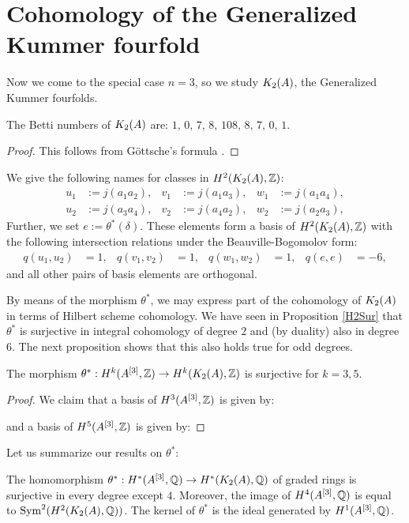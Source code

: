 \section{Cohomology of the Generalized Kummer fourfold}
Now we come to the special case $n=3$, so we study $\kum{A}{2}$, the Generalized Kummer fourfolds.
\begin{proposition}
The Betti numbers of $\kum{A}{2}$ are:
$
1,\,0,\,7,\,8,\,108,\,8,\,7,\,0,\,1.
$
\end{proposition}
\begin{proof}
This follows from G\"ottsche's formula \cite[page 49]{Gottsche}.
\end{proof}


\begin{notation} We give the following names for classes in $H^2(\kum{A}{2},\Z)$:
\begin{align*}
u_1 &:= j(a_1 a_2), & v_1 &:= j(a_1 a_3), & w_1 &:= j(a_1 a_4), \\ 
u_2 &:= j(a_3 a_4), & v_2 &:= j(a_4 a_2), & w_2 &:= j(a_2 a_3),
\end{align*}
Further, we set $e:=\theta^*(\delta)$.
These elements form a basis of $H^2(\kum{A}{2},\Z)$ with the following intersection relations under the Beauville-Bogomolov form:
\begin{align*}
q(u_1,u_2) &= 1, & q(v_1,v_2) &= 1, & q(w_1,w_2) &= 1,  &
q(e,e)&= -6,
\end{align*}
and all other pairs of basis elements are orthogonal.
\end{notation}
By means of the morphism $\theta^*$, we may express part of the cohomology of $\kum{A}{2}$ in terms of Hilbert scheme cohomology. We have seen in Proposition \ref{H2Sur} that $\theta^*$ is surjective in integral cohomology of degree $2$ and (by duality) also in degree $6$. 
The next proposition shows that this also holds true for odd degrees.
\begin{proposition}
The morphism $\theta^* : H^k(A\hilb{3},\Z) \rightarrow H^k(\kum{A}{2},\Z)$ is surjective for $k=3,5$.
\end{proposition}
\begin{proof}
We claim that a basis of $H^3(A\hilb{3},\Z)$ is given by:

and a basis of $H^5(A\hilb{3},\Z)$ is given by:
 
\end{proof}



Let us summarize our results on $\theta^*$:
\begin{theorem}
The homomorphism $\theta^* : H^*(A\hilb{3},\Q)\rightarrow H^*(\kum{A}{2},\Q)$ of graded rings is surjective in every degree except $4$. Moreover, the image of $H^4(A\hilb{3},\Q)$ is equal to $\Sym^2(H^2(\kum{A}{2},\Q))$. 
The kernel of $\theta^*$ is the ideal generated by $H^1(A\hilb{3},\Q)$.
\end{theorem}